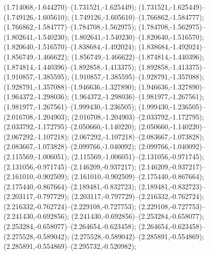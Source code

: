  (1.714068,-1.644270)--(1.731521,-1.625449);
 (1.731521,-1.625449)--(1.749126,-1.605610);
 (1.749126,-1.605610)--(1.766862,-1.584777);
 (1.766862,-1.584777)--(1.784708,-1.562975);
 (1.784708,-1.562975)--(1.802641,-1.540230);
 (1.802641,-1.540230)--(1.820640,-1.516570);
 (1.820640,-1.516570)--(1.838684,-1.492024);
 (1.838684,-1.492024)--(1.856749,-1.466622);
 (1.856749,-1.466622)--(1.874814,-1.440396);
 (1.874814,-1.440396)--(1.892858,-1.413375);
 (1.892858,-1.413375)--(1.910857,-1.385595);
 (1.910857,-1.385595)--(1.928791,-1.357088);
 (1.928791,-1.357088)--(1.946636,-1.327890);
 (1.946636,-1.327890)--(1.964372,-1.298036);
 (1.964372,-1.298036)--(1.981977,-1.267561);
 (1.981977,-1.267561)--(1.999430,-1.236505);
 (1.999430,-1.236505)--(2.016708,-1.204903);
 (2.016708,-1.204903)--(2.033792,-1.172795);
 (2.033792,-1.172795)--(2.050660,-1.140220);
 (2.050660,-1.140220)--(2.067292,-1.107218);
 (2.067292,-1.107218)--(2.083667,-1.073828);
 (2.083667,-1.073828)--(2.099766,-1.040092);
 (2.099766,-1.040092)--(2.115569,-1.006051);
 (2.115569,-1.006051)--(2.131056,-0.971745);
 (2.131056,-0.971745)--(2.146209,-0.937217);
 (2.146209,-0.937217)--(2.161010,-0.902509);
 (2.161010,-0.902509)--(2.175440,-0.867664);
 (2.175440,-0.867664)--(2.189481,-0.832723);
 (2.189481,-0.832723)--(2.203117,-0.797729);
 (2.203117,-0.797729)--(2.216332,-0.762724);
 (2.216332,-0.762724)--(2.229108,-0.727753);
 (2.229108,-0.727753)--(2.241430,-0.692856);
 (2.241430,-0.692856)--(2.253284,-0.658077);
 (2.253284,-0.658077)--(2.264654,-0.623458);
 (2.264654,-0.623458)--(2.275528,-0.589042);
 (2.275528,-0.589042)--(2.285891,-0.554869);
 (2.285891,-0.554869)--(2.295732,-0.520982);
